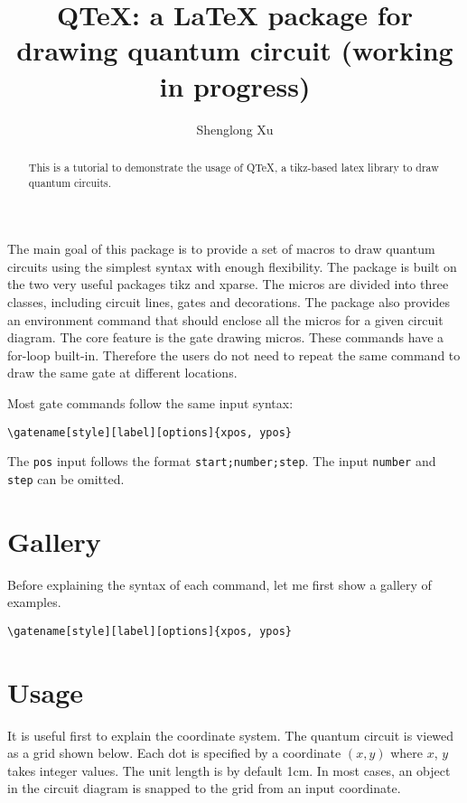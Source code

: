 \documentclass[aps,prl,showpacs,notitlepage,floatfix,superscriptaddress,nofootinbib]{revtex4-2}
\begin{document}
\title{QTeX: a LaTeX package for drawing quantum circuit (working in progress)}
\author{Shenglong Xu}


\begin{abstract}
    This is a tutorial to demonstrate the usage of QTeX, a tikz-based latex library to draw quantum circuits.
\end{abstract}

\maketitle


The main goal of this package is to provide a set of macros to draw quantum circuits using the simplest syntax with enough flexibility. The package is built on the two very useful packages tikz and xparse. The micros are divided into three classes, including circuit lines, gates and decorations. The package also provides an environment command that should enclose all the micros for a given circuit diagram. 
The core feature is the gate drawing micros. These commands have a for-loop built-in. Therefore the users do not need to repeat the same command to draw the same gate at different locations. 


Most gate commands follow the same input syntax:


\begin{verbatim}
\gatename[style][label][options]{xpos, ypos}
\end{verbatim}
The \verb|pos| input follows the format \verb|start;number;step|.
The input \verb|number| and \verb|step| can be omitted.

\section{Gallery}
Before explaining the syntax of each command, let me first show a gallery of examples.

\begin{Code}
\begin{qlego}
\end{qlego}
\tcblower
\begin{verbatim}
\gatename[style][label][options]{xpos, ypos}
\end{verbatim}

\end{Code}

\begin{Code}
\begin{qlego}
\end{qlego}
\end{Code}

\section{Usage}

It is useful first to explain the coordinate system. The quantum circuit is viewed as a grid shown below. Each dot is specified by a coordinate $(x, y)$ where $x$, $y$ takes integer values. The unit length is by default 1cm. In most cases, an object in the circuit diagram is snapped to the grid from an input coordinate. 
\end{document}
